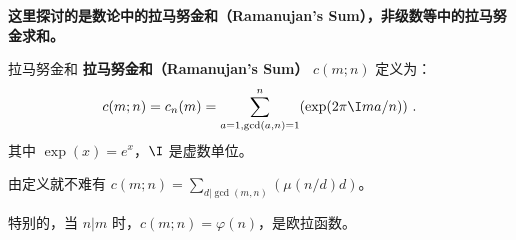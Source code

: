
\textbf{这里探讨的是数论中的拉马努金和（Ramanujan's Sum），非级数等中的拉马努金求和。}

\begin{definition}{拉马努金和}
\textbf{拉马努金和（Ramanujan's Sum）} $c(m; n)$ 定义为：
\begin{equation}
c(m; n) = c_n(m) = \sum_{a=1, \gcd(a, n) = 1}^n (\exp(2\pi \I m a / n)) ~.
\end{equation}
其中 $\exp(x) = e^x$，$\I$ 是虚数单位。
\end{definition}

由定义就不难有 $c(m; n) = \sum_{d | \gcd(m, n)} (\mu(n/d) d)$。

特别的，当 $n | m$ 时，$c(m; n) = \varphi(n)$，是欧拉函数。